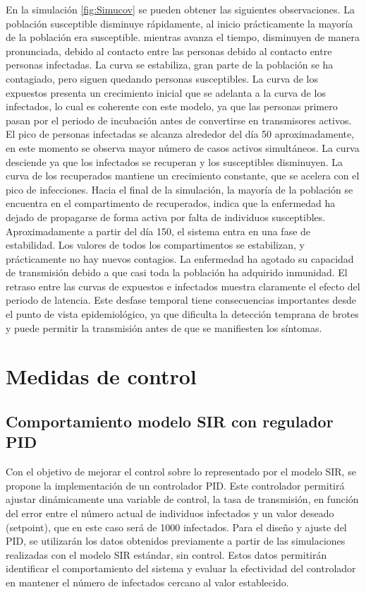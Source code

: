 En la simulación \ref{fig:Simucov} se pueden obtener las siguientes observaciones. La población susceptible disminuye rápidamente, al inicio prácticamente la mayoría de la población era susceptible. mientras avanza el tiempo, disminuyen de manera pronunciada, debido al contacto entre las personas debido al contacto entre personas infectadas. La curva se estabiliza, gran parte de la población se ha contagiado, pero siguen quedando personas susceptibles.
La curva de los expuestos presenta un crecimiento inicial que se adelanta a la curva de los infectados, lo cual es coherente con este modelo, ya que las personas primero pasan por el periodo de incubación antes de convertirse en transmisores activos. El pico de personas infectadas se alcanza alrededor del día 50 aproximadamente, en este momento se observa mayor número de casos activos simultáneos. La curva desciende ya que los infectados se recuperan y los susceptibles disminuyen.
La curva de los recuperados mantiene un crecimiento constante, que se acelera con el pico de infecciones. Hacia el final de la simulación, la mayoría de la población se encuentra en el compartimento de recuperados, indica que la enfermedad ha dejado de propagarse de forma activa por falta de individuos susceptibles.
Aproximadamente a partir del día 150, el sistema entra en una fase de estabilidad. Los valores de todos los compartimentos se estabilizan, y prácticamente no hay nuevos contagios.  La enfermedad ha agotado su capacidad de transmisión debido a que casi toda la población ha adquirido inmunidad.
El retraso entre las curvas de expuestos e infectados muestra claramente el efecto del periodo de latencia. Este desfase temporal tiene consecuencias importantes desde el punto de vista epidemiológico, ya que dificulta la detección temprana de brotes y puede permitir la transmisión antes de que se manifiesten los síntomas.




\section{Medidas de control}
\subsection{Comportamiento modelo SIR con regulador PID}
Con el objetivo de mejorar el control sobre lo representado por el modelo SIR, se propone la implementación de un controlador PID. Este controlador permitirá ajustar dinámicamente una variable de control, la tasa de transmisión, en función del error entre el número actual de individuos infectados y un valor deseado (setpoint), que en este caso será de 1000 infectados. Para el diseño y ajuste del PID, se utilizarán los datos obtenidos previamente a partir de las simulaciones realizadas con el modelo SIR estándar, sin control. Estos datos permitirán identificar el comportamiento del sistema y evaluar la efectividad del controlador en mantener el número de infectados cercano al valor establecido.

